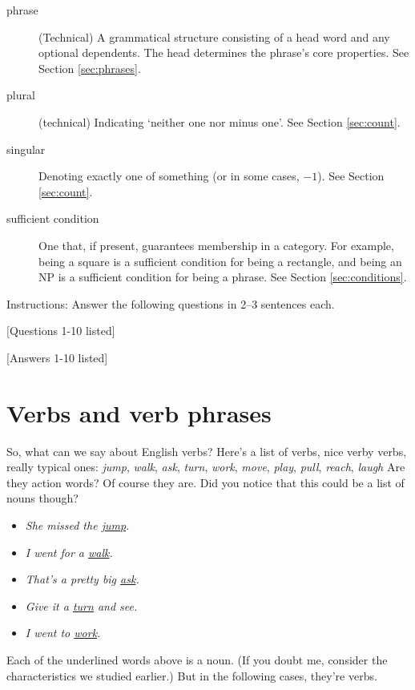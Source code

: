 \begin{description}
   \item[phrase] (Technical) A grammatical structure consisting of a head word and any optional dependents. The head determines the phrase's core properties. See Section \ref{sec:phrases}.
   
   \item[plural] (technical) Indicating `neither one nor minus one'. See Section \ref{sec:count}.
   
   \item[singular] Denoting exactly one of something (or in some cases, $-1$). See Section \ref{sec:count}.
   
   \item[sufficient condition] One that, if present, guarantees membership in a category. For example, being a square is a sufficient condition for being a rectangle, and being an NP is a sufficient condition for being a phrase. See Section \ref{sec:conditions}.
\end{description}

\begin{tcolorbox}[title=Short Answer Quiz, colback=white]

Instructions: Answer the following questions in 2--3 sentences each.

[Questions 1-10 listed]
    
\end{tcolorbox}

\begin{tcolorbox}[title=Answer Key, colback=white, colframe=black, coltitle=black, fonttitle=\bfseries, colbacktitle=gray!10!white]

[Answers 1-10 listed]

\end{tcolorbox}

\clearpage
\section{Verbs and verb phrases}\label{sec:verbs}

So, what can we say about English verbs? Here's a list of verbs, nice verby verbs, really typical ones: 
\ea 
    \textit{jump}, \textit{walk}, \textit{ask}, \textit{turn}, \textit{work}, \textit{move}, \textit{play}, \textit{pull}, \textit{reach}, \textit{laugh} \label{ex:verblist}
\z
{}Are they action words? Of course they are. Did you notice that this could be a list of nouns though?
\begin{itemize}[noitemsep]
    \item \textit{She missed the \uline{jump}.}
    \item \textit{I went for a \uline{walk}.}
    \item \textit{That's a pretty big \uline{ask}.}
    \item \textit{Give it a \uline{turn} and see.}
    \item \textit{I went to \uline{work}.}
\end{itemize}
Each of the underlined words above is a noun. (If you doubt me, consider the characteristics we studied earlier.) But in the following cases, they're verbs.


